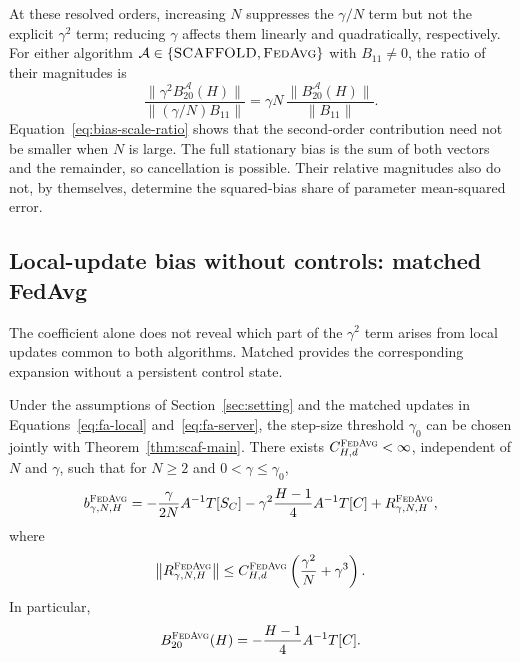 At these resolved orders, increasing $N$ suppresses the $\gamma/N$ term but not the explicit $\gamma^2$ term; reducing $\gamma$ affects them linearly and quadratically, respectively. For either algorithm $\mathcal A\in\{\textnormal{\textsc{SCAFFOLD}},\textnormal{\textsc{FedAvg}}\}$ with $B_{11}\ne0$, the ratio of their magnitudes is
\begin{equation}
\label{eq:bias-scale-ratio}
\frac{\|\gamma^2B_{20}^{\mathcal A}(H)\|}
     {\|(\gamma/N)B_{11}\|}
=\gamma N\,\frac{\|B_{20}^{\mathcal A}(H)\|}{\|B_{11}\|}.
\end{equation}
Equation~\eqref{eq:bias-scale-ratio} shows that the second-order contribution need not be smaller when $N$ is large. The full stationary bias is the sum of both vectors and the remainder, so cancellation is possible. Their relative magnitudes also do not, by themselves, determine the squared-bias share of parameter mean-squared error.

\subsection{Local-update bias without controls: matched FedAvg}

The \Scaf{} coefficient alone does not reveal which part of the $\gamma^2$ term arises from local updates common to both algorithms. Matched \FedAvg{} provides the corresponding expansion without a persistent control state.

\begin{theorem}
\label{thm:fa-main}
Under the assumptions of Section~\ref{sec:setting} and the matched \FedAvg{} updates in Equations~\eqref{eq:fa-local} and~\eqref{eq:fa-server}, the step-size threshold $\gamma_0$ can be chosen jointly with Theorem~\ref{thm:scaf-main}. There exists $C^{\textnormal{\textsc{FedAvg}}}_{H,d}<\infty$, independent of $N$ and $\gamma$, such that for $N\geq2$ and $0<\gamma\leq\gamma_0$,
\begin{equation}
\label{eq:fa-main-expansion}
b^{\textnormal{\textsc{FedAvg}}}_{\gamma,N,H}
=-\frac{\gamma}{2N}A^{-1}T[S_C]
-\gamma^2\frac{H-1}{4}A^{-1}T[C]
+R^{\textnormal{\textsc{FedAvg}}}_{\gamma,N,H},
\end{equation}
where
\begin{equation}
\label{eq:fa-main-rem}
\bigl\|R^{\textnormal{\textsc{FedAvg}}}_{\gamma,N,H}\bigr\|
\leq C^{\textnormal{\textsc{FedAvg}}}_{H,d}\left(\frac{\gamma^2}{N}+\gamma^3\right).
\end{equation}
In particular,
\begin{equation}
\label{eq:fa-B}
B_{20}^{\textnormal{\textsc{FedAvg}}}(H)=-\frac{H-1}{4}A^{-1}T[C].
\end{equation}
\end{theorem}

